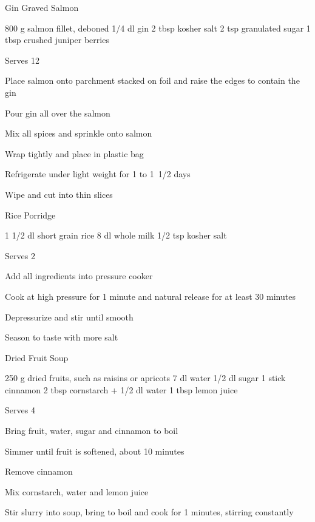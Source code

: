 \begin{recipe}{Gin Graved Salmon}{}
\begin{ingredients}
800 g salmon fillet, deboned
1/4 dl gin
2 tbsp kosher salt
2 tsp granulated sugar
1 tbsp crushed juniper berries
\end{ingredients}
\nextcolumn
Serves 12
\begin{steps}
    \item Place salmon onto parchment stacked on foil and raise the edges to contain the gin
    \item Pour gin all over the salmon
    \item Mix all spices and sprinkle onto salmon
    \item Wrap tightly and place in plastic bag
    \item Refrigerate under light weight for 1 to 1~1/2 days
    \item Wipe and cut into thin slices
\end{steps}
\end{recipe}

\begin{recipe}{Rice Porridge}{}
\begin{ingredients}
1 1/2 dl short grain rice
8 dl whole milk
1/2 tsp kosher salt
\end{ingredients}
\nextcolumn
Serves 2
\begin{steps}
    \item Add all ingredients into pressure cooker
    \item Cook at high pressure for 1 minute and natural release for at least 30 minutes
    \item Depressurize and stir until smooth
    \item Season to taste with more salt
\end{steps}
\end{recipe}

\begin{recipe}{Dried Fruit Soup}{}
\begin{ingredients}
250 g dried fruits, such as raisins or apricots
7 dl water
1/2 dl sugar
1 stick cinnamon
2 tbsp cornstarch + 1/2 dl water
1 tbsp lemon juice
\end{ingredients}
\nextcolumn
Serves 4
\begin{steps}
    \item Bring fruit, water, sugar and cinnamon to boil
    \item Simmer until fruit is softened, about 10 minutes
    \item Remove cinnamon
    \item Mix cornstarch, water and lemon juice
    \item Stir slurry into soup, bring to boil and cook for 1 minutes, stirring constantly
\end{steps}
\end{recipe}

